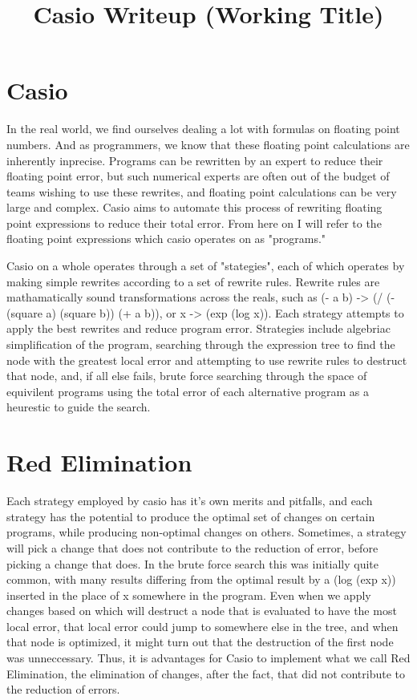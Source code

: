 \documentclass{article}
\title{Casio Writeup (Working Title)}
\begin{document}
\maketitle

\section{Casio}

In the real world, 
we find ourselves dealing a lot with formulas 
on floating point numbers. 
And as programmers, 
we know that these floating point calculations 
are inherently inprecise. 
Programs can be rewritten by an expert to reduce their floating point error, 
but such numerical experts are often out of the budget of teams wishing to use these rewrites, 
and floating point calculations can be very large and complex. 
Casio aims to automate this process of rewriting floating point expressions 
to reduce their total error. 
From here on I will refer to the floating point expressions 
which casio operates on 
as "programs."

Casio on a whole operates through a set of "stategies", 
each of which operates by making simple rewrites according to a set of rewrite rules. 
Rewrite rules are mathamatically sound transformations across the reals, 
such as (- a b) -> (/ (- (square a) (square b)) (+ a b)), 
or x -> (exp (log x)). 
Each strategy attempts to apply the best rewrites 
and reduce program error. 
Strategies include algebriac simplification of the program, 
searching through the expression tree to find the node with the greatest local error 
and attempting to use rewrite rules to destruct that node, 
and, if all else fails, 
brute force searching through the space of equivilent programs 
using the total error of each alternative program 
as a heurestic to guide the search.

\section{Red Elimination}

Each strategy employed by casio 
has it's own merits and pitfalls, 
and each strategy has the potential 
to produce the optimal set of changes on certain programs, 
while producing non-optimal changes on others. 
Sometimes, a strategy will pick a change 
that does not contribute to the reduction of error, 
before picking a change that does. 
In the brute force search this was initially quite common, 
with many results differing from the optimal result 
by a (log (exp x)) inserted in the place of x 
somewhere in the program. 
Even when we apply changes based on which will destruct a node 
that is evaluated to have the most local error, 
that local error could jump to somewhere else in the tree, 
and when that node is optimized, 
it might turn out that the destruction of the first node was unneccessary. 
Thus, it is advantages for Casio 
to implement what we call Red Elimination, 
the elimination of changes, after the fact, 
that did not contribute to the reduction of errors.
\end{document}
